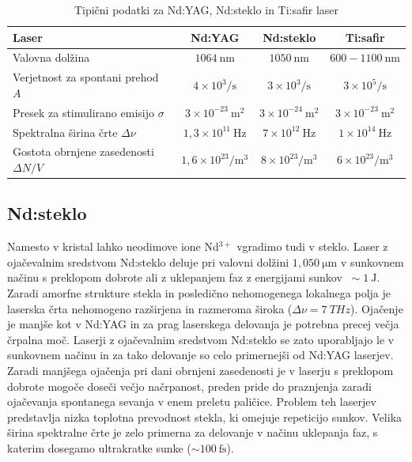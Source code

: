 \begin{table}[ht]
\small
\begin{center}
\begin{tabular}{|l|c|c|c|}\hline
Laser & Nd:YAG & Nd:steklo & Ti:safir \\ \hline
Valovna dolžina  & $1064~\si{\nano\metre}$ & $1050~\si{\nano\metre}$ & 
 $600-1100~\si{\nano\metre}$\\ \hline
Verjetnost za spontani prehod $A$ & $4 \times 10^3/\si{\second}$ & $3 \times 10^3/\si{\second}$
& $3 \times 10^5/\si{\second}$\\ \hline
Presek za stimulirano emisijo $\sigma$ & $3 \times 10^{-23}~\si{\metre}^2$ &
$3 \times 10^{-24}~\si{\metre}^2$ & $3 \times 10^{-23}~\si{\metre}^2$\\ \hline
Spektralna širina črte $\Delta \nu$ & $1,3 \times 10^{11}~\si{\hertz}$ &
$7 \times 10^{12}~\si{\hertz}$ & $1 \times 10^{14}~\si{\hertz}$\\ \hline
Gostota obrnjene zasedenosti $\Delta N/V$ & $1,6 \times 10^{23}/\si{\metre}^3$ &
$8 \times 10^{23}/\si{\metre}^3$ & $6 \times 10^{23}/\si{\metre}^3$\\ \hline
\end{tabular}
\caption{Tipični podatki za Nd:YAG, Nd:steklo in Ti:safir laser}
\label{tab:nd}
\end{center}
\end{table}

\subsection{Nd:steklo}
Namesto v kristal lahko neodimove ione Nd$^{3+}$ vgradimo tudi v steklo. 
Laser z ojačevalnim sredstvom Nd:steklo  deluje 
pri valovni dolžini $1,050~\si{\micro\meter}$ v sunkovnem načinu 
s preklopom dobrote ali z uklepanjem faz z energijami sunkov $~\sim 1~\si{\joule}$.
Zaradi amorfne strukture stekla in posledično 
nehomogenega lokalnega polja je laserska črta nehomogeno razširjena in razmeroma široka
($\Delta \nu = 7~\si{THz}$).
Ojačenje je manjše kot v Nd:YAG in za prag laserskega delovanja je
potrebna precej večja črpalna moč. Laserji z ojačevalnim sredstvom Nd:steklo se zato uporabljajo le v 
sunkovnem načinu in za tako delovanje so celo primernejši od Nd:YAG laserjev.
Zaradi manjšega ojačenja pri dani obrnjeni zasedenosti 
je v laserju s preklopom dobrote mogoče doseči večjo načrpanost, preden pride do praznjenja
zaradi ojačevanja spontanega sevanja v enem preletu paličice. Problem teh laserjev
predstavlja nizka toplotna prevodnost stekla, ki omejuje repeticijo sunkov.
Velika širina spektralne črte je zelo primerna za delovanje v načinu uklepanja faz, s 
katerim dosegamo ultrakratke sunke ($\sim 100~\si{\femto\second}$). 

